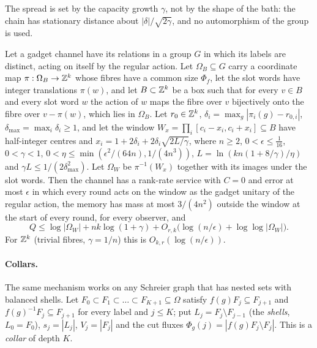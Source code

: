The spread is set by the capacity growth $\gamma$, not by the shape of the bath: the chain has stationary distance about $|\delta|/\sqrt{2\gamma}$, and
no automorphism of the group is used.

\begin{theorem}\label{thm:fibred}
Let a gadget channel have its relations in a group $G$ in which its labels are distinct, acting on itself by the regular action. Let
$\Omega_B\subseteq G$ carry a coordinate map $\pi:\Omega_B\to\mathbb Z^k$ whose fibres have a common size $\Phi_f$, let the slot words have integer
translations $\pi(w)$, and let $B\subset\mathbb Z^k$ be a box such that for every $v\in B$ and every slot word $w$ the action of $w$ maps the fibre over $v$
bijectively onto the fibre over $v-\pi(w)$, which lies in $\Omega_B$. Let $r_0\in\mathbb Z^k$, $\delta_i=\max_g|\pi_i(g)-r_{0,i}|$, $\delta_{\max}=\max_i\delta_i\ge1$,
and let the window $W_x=\prod_i[c_i-x_i,c_i+x_i]\subseteq B$ have half-integer centres and $x_i=1+2\delta_i+2\delta_i\sqrt{2L/\gamma}$, where $n\ge2$,
$0<\epsilon\le\frac1{16}$, $0<\gamma<1$, $0<\eta\le\min(\epsilon^2/(64n),1/(4n^3))$, $L=\ln(kn(1+8/\gamma)/\eta)$ and $\gamma L\le1/(2\delta_{\max}^2)$. Let
$\Omega_W$ be $\pi^{-1}(W_x)$ together with its images under the slot words. Then the channel has a rank-rate service with $C=0$ and error at most
$\epsilon$ in which every round acts on the window as the gadget unitary of the regular action, the memory has mass at most $3/(4n^2)$ outside the
window at the start of every round, for every observer, and
\[
Q\le\log|\Omega_W|+nk\log(1+\gamma)+O_{r,k}\bigl(\log(n/\epsilon)+\log\log|\Omega_W|\bigr).
\]
For $\mathbb Z^k$ (trivial fibres, $\gamma=1/n$) this is $O_{k,r}(\log(n/\epsilon))$.
\end{theorem}

\paragraph{Collars.} The same mechanism works on any Schreier graph that has nested sets with balanced shells. Let
$F_0\subset F_1\subset\dots\subset F_{K+1}\subseteq\Omega$ satisfy $f(g)F_j\subseteq F_{j+1}$ and $f(g)^{-1}F_j\subseteq F_{j+1}$ for every label and $j\le K$; put
$L_j=F_j\setminus F_{j-1}$ (the \emph{shells}, $L_0=F_0$), $s_j=|L_j|$, $V_j=|F_j|$ and the cut fluxes $\Phi_g(j)=|f(g)F_j\setminus F_j|$. This is a
\emph{collar} of depth $K$.

